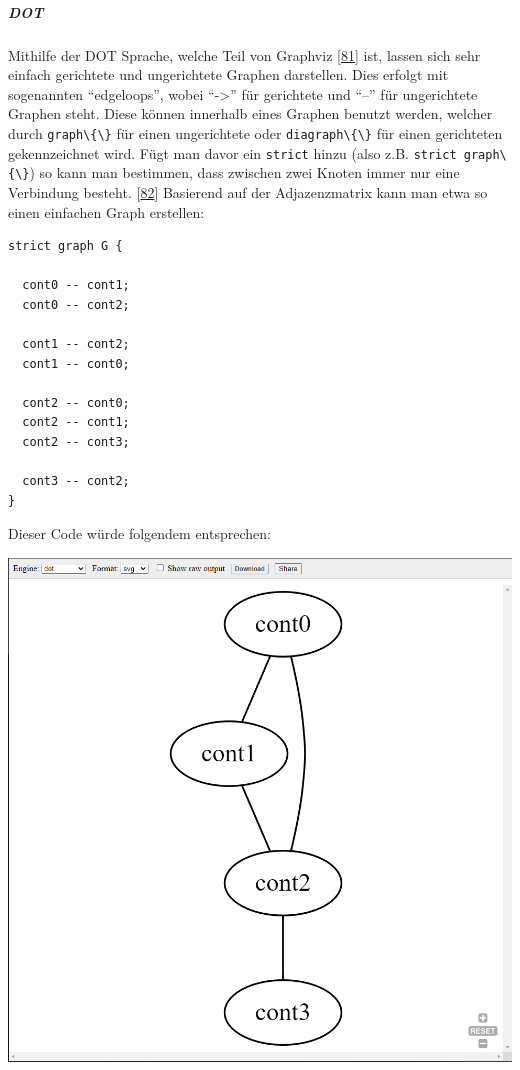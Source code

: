 \documentclass[
    headings=optiontotocandhead,%
    twoside,
    numbers=noenddot,%
    12pt, %
    titlepage, %
    parskip=full, %
    listof=leveldown, 
    numbers=noenddot, %
    a4paper,DIV=14,
    BCOR=15mm,
]{scrbook}
\newcommand{\passthrough}[1]{#1}
\let\origfigure=\figure
\let\endorigfigure=\endfigure
\renewenvironment{figure}[1][]{%
   \origfigure[H]
}{%
   \endorigfigure
}
\begin{document}
\hypertarget{dot}{%
\subparagraph{DOT}\label{dot}}

Mithilfe der DOT Sprache, welche Teil von Graphviz
{[}\protect\hyperlink{ref-Graphviz-Homepage}{81}{]} ist, lassen sich
sehr einfach gerichtete und ungerichtete Graphen darstellen. Dies
erfolgt mit sogenannten ``edgeloops'', wobei ``-\textgreater{}'' für
gerichtete und ``--'' für ungerichtete Graphen steht. Diese können
innerhalb eines Graphen benutzt werden, welcher durch
\passthrough{\lstinline!graph\{\}!} für einen ungerichtete oder
\passthrough{\lstinline!diagraph\{\}!} für einen gerichteten
gekennzeichnet wird. Fügt man davor ein \passthrough{\lstinline!strict!}
hinzu (also z.B. \passthrough{\lstinline!strict graph\{\}!}) so kann man
bestimmen, dass zwischen zwei Knoten immer nur eine Verbindung besteht.
{[}\protect\hyperlink{ref-GraphViz-Documentation}{82}{]} Basierend auf
der Adjazenzmatrix kann man etwa so einen einfachen Graph erstellen:

\begin{lstlisting}[caption={Beispiel DOT Code}]
strict graph G {
    
  cont0 -- cont1;
  cont0 -- cont2;
  
  cont1 -- cont2;
  cont1 -- cont0;
  
  cont2 -- cont0;
  cont2 -- cont1;
  cont2 -- cont3;
  
  cont3 -- cont2;
}
\end{lstlisting}

Dieser Code würde folgendem entsprechen:

\begin{figure}
\centering
\includegraphics{img/Gekle/DotGraph.png}
\caption{Ungerichteter Graph mit DOT}
\end{figure}
\end{document}
